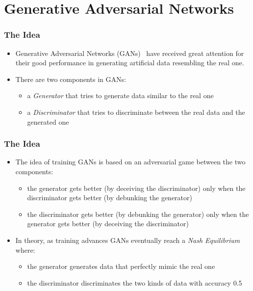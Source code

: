 \documentclass{beamer}
\begin{document}
\section{Generative Adversarial Networks}
\begin{frame}
\setlength{\leftmargini}{0.3cm}
\setlength{\leftmarginii}{0.6cm}
\setlength{\leftmarginiii}{0.9cm}
\frametitle{The Idea}
\begin{itemize}
\item Generative Adversarial Networks (GANs)~\cite{goodfellow2014generative} have received great attention for their good performance in generating artificial data resembling the real one. 
\item There are two components in GANs:
	\begin{itemize}
	\item a \emph{Generator} that tries to generate data similar to the real one
	\item a \emph{Discriminator} that tries to discriminate between the real data and the generated one
	\end{itemize}
\end{itemize}
\end{frame}

\begin{frame}
\setlength{\leftmargini}{0.3cm}
\setlength{\leftmarginii}{0.6cm}
\setlength{\leftmarginiii}{0.9cm}
\frametitle{The Idea}
\begin{itemize}
\item The idea of training GANs is based on an adversarial game  between the two components:
	\begin{itemize}
	\item the generator gets better (by deceiving the discriminator) only when the discriminator gets better (by debunking the generator)
	\item the discriminator gets better (by debunking the generator) only when the generator gets better (by deceiving the discriminator)
	\end{itemize}
\item In theory, as training advances GANs eventually reach a \emph{Nash Equilibrium} where:
	\begin{itemize}
	\item the generator generates data that perfectly mimic the real one
	\item the discriminator discriminates the two kinds of data with accuracy 0.5
	\end{itemize}
\end{itemize}
\end{frame}
\end{document}

